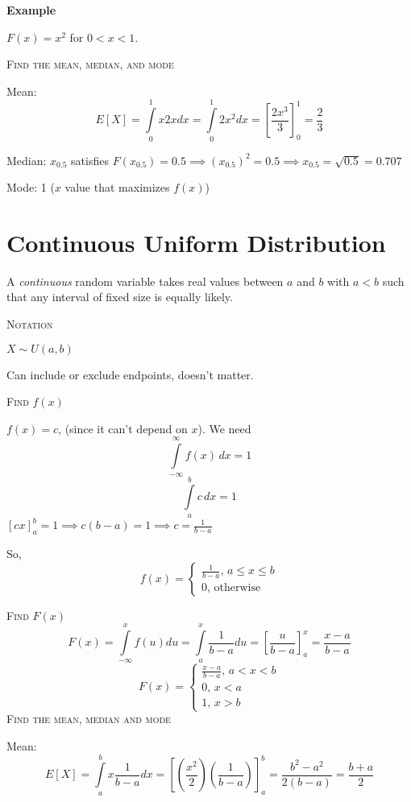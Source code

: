 \textbf{Example}

$ F(x)=x^2 $ for $ 0<x<1 $.

\textsc{Find the mean, median, and mode}

Mean:
\[ E[X]=\int\limits_{0}^{1} x2x d{x} =\int\limits_{0}^{1} 2x^2 d{x}=
    \left[\frac{2x^3}{3}\right]_0^1=\frac{2}{3} \]

Median:
$ x_{0.5} $ satisfies $ F(x_{0.5})=0.5 \implies (x_{0.5})^2=0.5\implies x_{0.5}=
    \sqrt{0.5}=0.707$

Mode: 1 ($ x $ value that maximizes $ f(x) $)

\section{Continuous Uniform Distribution}
A \emph{continuous} random variable takes real values between $ a $ and
$ b $ with $ a<b $ such that any interval of fixed size is equally likely.

\textsc{Notation}

$ X \sim U(a,b) $
\begin{remark}
    Can include or exclude endpoints, doesn't matter.
\end{remark}

\textsc{Find $f(x)$}

$ f(x)=c $, (since it can't depend on $ x $). We need
\[ \int\limits_{-\infty}^{\infty} f(x)\,d{x} =1 \]
\[ \int\limits_{a}^{b} c\,d{x} =1 \]
$ \left[cx\right]_a^b=1\implies c(b-a)=1\implies c=\frac{1}{b-a} $

So,
\[ f(x)=\begin{cases}
        \frac{1}{b-a},\, a\le x\le b \\
        0,\, \text{otherwise}
    \end{cases} \]

\textsc{Find $ F(x) $}
\[ F(x)=\int\limits_{-\infty}^{x} f(u) d{u}
    =\int\limits_{a}^{x} \frac{1}{b-a} d{u}
    =\left[\frac{u}{b-a}\right]_a^x=\frac{x-a}{b-a} \]
\[ F(x)=\begin{cases}
        \frac{x-a}{b-a},\, a<x<b \\
        0,\,x<a                  \\
        1,\,x>b
    \end{cases} \]
\textsc{Find the mean, median and mode}

Mean:
\[ E[X]=\int\limits_{a}^{b} x \frac{1}{b-a} d{x}
    =\left[\left(\frac{x^2}{2}\right)\left(\frac{1}{b-a}\right)\right]_a^b
    =\frac{b^2-a^2}{2(b-a)}=\frac{b+a}{2} \]


